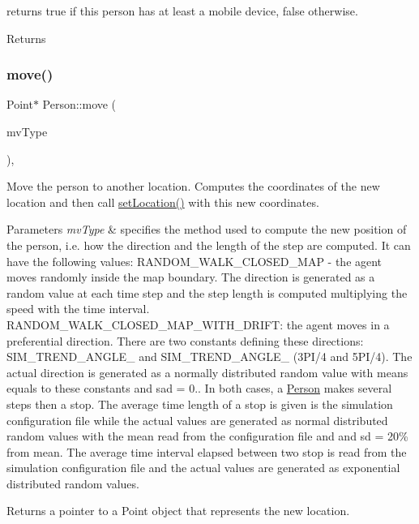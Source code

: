 returns true if this person has at least a mobile device, false otherwise. \begin{DoxyReturn}{Returns}

\end{DoxyReturn}
\mbox{\label{class_person_a89843e85f14abc08422273c20252ae23}} 
\subsubsection{\texorpdfstring{move()}{move()}}
{\footnotesize\ttfamily Point$\ast$ Person\+::move (\begin{DoxyParamCaption}\item[{\mbox{\hyperlink{_movement_type_8h_a8a93b61bc797a7d1907f42796a252493}{Movement\+Type}}}]{mv\+Type }\end{DoxyParamCaption})\hspace{0.3cm}{\ttfamily [override]}, {\ttfamily [virtual]}}

Move the person to another location. Computes the coordinates of the new location and then call \mbox{\hyperlink{class_person_a05f4ac2107d59e03f0f336eda08aa358}{set\+Location()}} with this new coordinates.


\begin{DoxyParams}{Parameters}
{\em mv\+Type} & specifies the method used to compute the new position of the person, i.\+e. how the direction and the length of the step are computed. It can have the following values\+: R\+A\+N\+D\+O\+M\+\_\+\+W\+A\+L\+K\+\_\+\+C\+L\+O\+S\+E\+D\+\_\+\+M\+AP -\/ the agent moves randomly inside the map boundary. The direction is generated as a random value at each time step and the step length is computed multiplying the speed with the time interval. R\+A\+N\+D\+O\+M\+\_\+\+W\+A\+L\+K\+\_\+\+C\+L\+O\+S\+E\+D\+\_\+\+M\+A\+P\+\_\+\+W\+I\+T\+H\+\_\+\+D\+R\+I\+FT\+: the agent moves in a preferential direction. There are two constants defining these directions\+: S\+I\+M\+\_\+\+T\+R\+E\+N\+D\+\_\+\+A\+N\+G\+L\+E\+\_ and S\+I\+M\+\_\+\+T\+R\+E\+N\+D\+\_\+\+A\+N\+G\+L\+E\+\_ (3P\+I/4 and 5P\+I/4). The actual direction is generated as a normally distributed random value with means equals to these constants and sad = 0.. In both cases, a \mbox{\hyperlink{class_person}{Person}} makes several steps then a stop. The average time length of a stop is given is the simulation configuration file while the actual values are generated as normal distributed random values with the mean read from the configuration file and and sd = 20\% from mean. The average time interval elapsed between two stop is read from the simulation configuration file and the actual values are generated as exponential distributed random values. \\
\hline
\end{DoxyParams}
\begin{DoxyReturn}{Returns}
a pointer to a Point object that represents the new location. 
\end{DoxyReturn}


